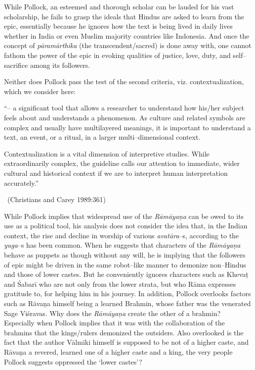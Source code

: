 While Pollock, an esteemed and thorough scholar can be lauded for his vast scholarship, he fails to grasp the ideals that Hindus are asked to learn from the epic, essentially because he ignores how the text is being lived in daily lives whether in India or even Muslim majority countries like Indonesia. And once the concept of \textit{pāramārthika} (the transcendent/sacred) is done away with, one cannot fathom the power of the epic in evoking qualities of justice, love, duty, and self–sacrifice among its followers.

Neither does Pollock pass the test of the second criteria, viz. contextualization, which we consider here:

\begin{myquote}
“– a significant tool that allows a researcher to understand how his/her subject feels about and understands a phenomenon. As culture and related symbols are complex and usually have multilayered meanings, it is important to understand a text, an event, or a ritual, in a larger multi–dimensional context.
\end{myquote}

\begin{myquote}
Contextualization is a vital dimension of interpretive studies. While extraordinarily complex, the guideline calls our attention to immediate, wider cultural and historical context if we are to interpret human interpretation accurately.” 

~\hfill (Christians and Carey 1989:361)
\end{myquote}

While Pollock implies that widespread use of the \textit{Rāmāyaṇa} can be owed to its use as a political tool, his analysis does not consider the idea that, in the Indian context, the rise and decline in worship of various \textit{avatāra}–s, according to the \textit{yuga}–s has been common. When he suggests that characters of the \textit{Rāmāyaṇa} behave as puppets as though without any will, he is implying that the followers of epic might be driven in the same robot–like manner to demonize non–Hindus and those of lower castes. But he conveniently ignores characters such as Khevaṭ and Śabarī who are not only from the lower strata, but who Rāma expresses gratitude to, for helping him in his journey. In addition, Pollock overlooks factors such as Rāvaṇa himself being a learned Brahmin, whose father was the venerated Sage Viśravas. Why does the \textit{Rāmāyaṇa} create the other of a brahmin? Especially when Pollock implies that it was with the collaboration of the brahmins that the kings/rulers demonized the outsiders. Also overlooked is the fact that the author Vālmīki himself is supposed to be not of a higher caste, and Rāvaṇa a revered, learned one of a higher caste and a king, the very people Pollock suggests oppressed the ‘lower castes’?

